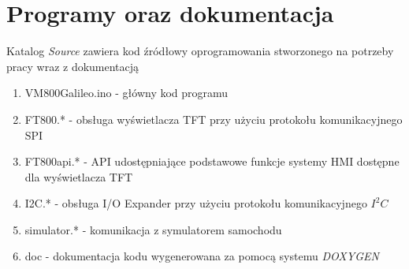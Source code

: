 \documentclass{xmgr}
\begin{document}
\chapter{Programy oraz dokumentacja}
Katalog \emph{Source} zawiera kod źródłowy oprogramowania stworzonego na potrzeby pracy wraz z dokumentacją 
\begin{enumerate} 
	\item VM800Galileo.ino - główny kod programu
	\item FT800.* - obsługa wyświetlacza TFT przy użyciu protokołu komunikacyjnego SPI
	\item FT800api.* - API udostępniające podstawowe funkcje systemy HMI dostępne dla wyświetlacza TFT
	\item I2C.* - obsługa I/O Expander przy użyciu protokołu komunikacyjnego $I^2C$
	\item simulator.* - komunikacja z symulatorem samochodu
	\item doc - dokumentacja kodu wygenerowana za pomocą systemu \emph{DOXYGEN} 
\end{enumerate}




\listoftables

\listoffigures

\oswiadczenie
\end{document}
